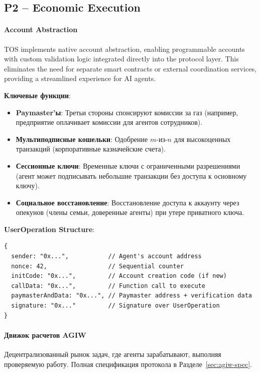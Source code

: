 \documentclass[11pt]{article}
\begin{document}
\subsection{P2 -- Economic Execution}
\label{sec:pillar-economic}

\paragraph{Account Abstraction}
TOS implements native account abstraction, enabling programmable accounts with custom validation logic integrated directly into the protocol layer. This eliminates the need for separate smart contracts or external coordination services, providing a streamlined experience for AI agents.

\textbf{Ключевые функции}:
\begin{itemize}[noitemsep]
  \item \textbf{Paymaster'ы}: Третьи стороны спонсируют комиссии за газ (например, предприятие оплачивает комиссии для агентов сотрудников).
  \item \textbf{Мультиподписные кошельки}: Одобрение $m$-из-$n$ для высокоценных транзакций (корпоративные казначейские счета).
  \item \textbf{Сессионные ключи}: Временные ключи с ограниченными разрешениями (агент может подписывать небольшие транзакции без доступа к основному ключу).
  \item \textbf{Социальное восстановление}: Восстановление доступа к аккаунту через опекунов (члены семьи, доверенные агенты) при утере приватного ключа.
\end{itemize}

\textbf{UserOperation Structure}:
\begin{verbatim}
{
  sender: "0x...",           // Agent's account address
  nonce: 42,                 // Sequential counter
  initCode: "0x...",         // Account creation code (if new)
  callData: "0x...",         // Function call to execute
  paymasterAndData: "0x...", // Paymaster address + verification data
  signature: "0x..."         // Signature over UserOperation
}
\end{verbatim}

\paragraph{Движок расчетов AGIW}
Децентрализованный рынок задач, где агенты зарабатывают, выполняя проверяемую работу. Полная спецификация протокола в Разделе~\ref{sec:agiw-spec}.
\end{document}
